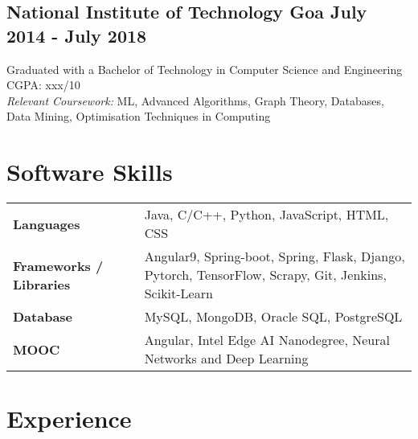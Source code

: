 \documentclass[a4,10pt]{article}
\newcommand{\hskills}[1]{
\textbf{\bfseries #1} }
\begin{document}
\vspace{-0.25cm}
\subsection*{National Institute of Technology Goa  \hfill July 2014 - July 2018 } 
{Graduated with a Bachelor of Technology in Computer Science and Engineering  \hfill{CGPA: xxx/10}} \\
\textit{Relevant Coursework:} ML, Advanced Algorithms, Graph Theory, Databases, Data Mining, Optimisation Techniques in Computing

\vspace{-0.2cm}

\section{Software Skills}
\begin{tabular}{p{11em} p{1em} p{43em}}
\hskills{Languages }&  & Java, C/C++, Python, JavaScript, HTML, CSS \\
\hskills{Frameworks / Libraries}& &  Angular9, Spring-boot, Spring, Flask, Django, Pytorch, TensorFlow, Scrapy, Git, Jenkins, Scikit-Learn \\
\hskills{Database}& & MySQL, MongoDB, Oracle SQL, PostgreSQL \\
\hskills{MOOC} &  & Angular, Intel Edge AI Nanodegree, Neural Networks and Deep Learning  \\
\end{tabular}
\vspace{-0.2cm}


\section{Experience}

        
\end{document}
